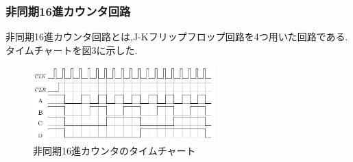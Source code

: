 \documentclass[twocolumn, 10pt,a4j]{jsarticle}
\begin{document}
    \subsubsection{非同期16進カウンタ回路}
      非同期16進カウンタ回路とは,J-Kフリップフロップ回路を4つ用いた回路である.
      タイムチャートを図3に示した.
      \begin{figure}[H]
        \begin{center}
          \includegraphics[width=7cm]{../img/junjokairo/hidouki_16shin_dousahyou.png}
          \caption{非同期16進カウンタのタイムチャート}
        \end{center}
      \end{figure}
\end{document}
